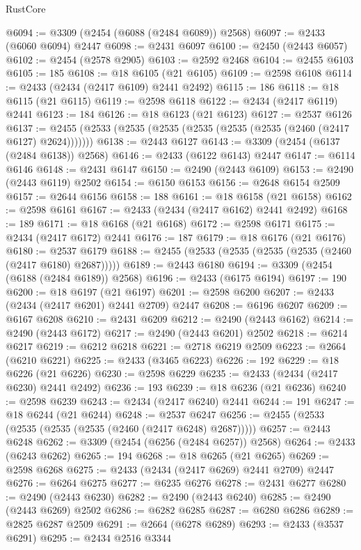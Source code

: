 \begin{lexlean}{RustCore}
\begin{coremodule}
@6094 := @3309 (@2454 (@6088 (@2484 @6089)) @2568)
@6097 := @2433 (@6060 @6094) @2447
@6098 := @2431 @6097
@6100 := @2450 (@2443 @6057)
@6102 := @2454 (@2578 @2905)
@6103 := @2592 @2468
@6104 := @2455 @6103
@6105 := 185
@6108 := @18 @6105 (@21 @6105)
@6109 := @2598 @6108
@6114 := @2433 (@2434 (@2417 @6109) @2441 @2492)
@6115 := 186
@6118 := @18 @6115 (@21 @6115)
@6119 := @2598 @6118
@6122 := @2434 (@2417 @6119) @2441
@6123 := 184
@6126 := @18 @6123 (@21 @6123)
@6127 := @2537 @6126
@6137 := @2455 (@2533 (@2535 (@2535 (@2535 (@2535 (@2535 (@2460 (@2417 @6127) @2624)))))))
@6138 := @2443 @6127
@6143 := @3309 (@2454 (@6137 (@2484 @6138)) @2568)
@6146 := @2433 (@6122 @6143) @2447
@6147 := @6114 @6146
@6148 := @2431 @6147
@6150 := @2490 (@2443 @6109)
@6153 := @2490 (@2443 @6119) @2502
@6154 := @6150 @6153
@6156 := @2648 @6154 @2509
@6157 := @2644 @6156
@6158 := 188
@6161 := @18 @6158 (@21 @6158)
@6162 := @2598 @6161
@6167 := @2433 (@2434 (@2417 @6162) @2441 @2492)
@6168 := 189
@6171 := @18 @6168 (@21 @6168)
@6172 := @2598 @6171
@6175 := @2434 (@2417 @6172) @2441
@6176 := 187
@6179 := @18 @6176 (@21 @6176)
@6180 := @2537 @6179
@6188 := @2455 (@2533 (@2535 (@2535 (@2535 (@2460 (@2417 @6180) @2687)))))
@6189 := @2443 @6180
@6194 := @3309 (@2454 (@6188 (@2484 @6189)) @2568)
@6196 := @2433 (@6175 @6194)
@6197 := 190
@6200 := @18 @6197 (@21 @6197)
@6201 := @2598 @6200
@6207 := @2433 (@2434 (@2417 @6201) @2441 @2709) @2447
@6208 := @6196 @6207
@6209 := @6167 @6208
@6210 := @2431 @6209
@6212 := @2490 (@2443 @6162)
@6214 := @2490 (@2443 @6172)
@6217 := @2490 (@2443 @6201) @2502
@6218 := @6214 @6217
@6219 := @6212 @6218
@6221 := @2718 @6219 @2509
@6223 := @2664 (@6210 @6221)
@6225 := @2433 (@3465 @6223)
@6226 := 192
@6229 := @18 @6226 (@21 @6226)
@6230 := @2598 @6229
@6235 := @2433 (@2434 (@2417 @6230) @2441 @2492)
@6236 := 193
@6239 := @18 @6236 (@21 @6236)
@6240 := @2598 @6239
@6243 := @2434 (@2417 @6240) @2441
@6244 := 191
@6247 := @18 @6244 (@21 @6244)
@6248 := @2537 @6247
@6256 := @2455 (@2533 (@2535 (@2535 (@2535 (@2460 (@2417 @6248) @2687)))))
@6257 := @2443 @6248
@6262 := @3309 (@2454 (@6256 (@2484 @6257)) @2568)
@6264 := @2433 (@6243 @6262)
@6265 := 194
@6268 := @18 @6265 (@21 @6265)
@6269 := @2598 @6268
@6275 := @2433 (@2434 (@2417 @6269) @2441 @2709) @2447
@6276 := @6264 @6275
@6277 := @6235 @6276
@6278 := @2431 @6277
@6280 := @2490 (@2443 @6230)
@6282 := @2490 (@2443 @6240)
@6285 := @2490 (@2443 @6269) @2502
@6286 := @6282 @6285
@6287 := @6280 @6286
@6289 := @2825 @6287 @2509
@6291 := @2664 (@6278 @6289)
@6293 := @2433 (@3537 @6291)
@6295 := @2434 @2516 @3344

\end{coremodule}
\end{lexlean}
